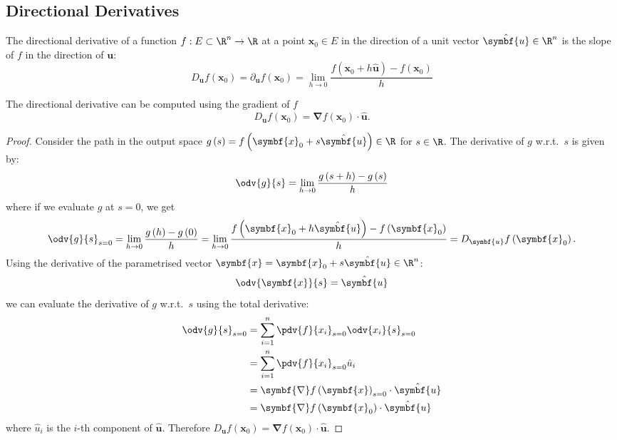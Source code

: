 \documentclass{article}
\begin{document}
\subsection{Directional Derivatives}
The directional derivative of a function \(f : E \subset \R^n \to \R\)
at a point \(\symbf{x}_0 \in E\) in the direction of a unit vector
\(\hat{\symbf{u}} \in \R^n\) is the slope of \(f\) in the direction of
\(\symbf{u}\):
\begin{equation*}
    D_{\symbf{u}} f\left( \symbf{x}_0 \right) = \partial_{\symbf{u}} f\left( \symbf{x}_0 \right) = \lim_{h \to 0}
     \frac{f\left( \symbf{x}_0 + h \hat{\symbf{u}} \right) - f\left(
     \symbf{x}_0 \right)}{h}
\end{equation*}
\begin{proposition}
    The directional derivative can be computed using the gradient of \(f\)
    \begin{equation*}
        D_{\symbf{u}} f\left( \symbf{x}_0 \right) = \symbf{\nabla} f\left( \symbf{x}_0 \right) \cdot \hat{\symbf{u}}.
    \end{equation*}
\end{proposition}
\begin{proof}
    Consider the path in the output space \(g\left( s \right) = f\left( \symbf{x}_0 + s \hat{\symbf{u}} \right) \in \R\) for \(s \in \R\).
    The derivative of \(g\) w.r.t.\ \(s\) is given by:
    \begin{equation*}
        \odv{g}{s} = \lim_{h \to 0} \frac{g\left( s + h \right) - g\left( s \right)}{h}
    \end{equation*}
    where if we evaluate \(g\) at \(s = 0\), we get
    \begin{equation*}
        \odv{g}{s}_{s = 0} = \lim_{h \to 0} \frac{g\left( h \right) - g\left( 0 \right)}{h} = \lim_{h \to 0} \frac{f\left( \symbf{x}_0 + h \hat{\symbf{u}} \right) - f\left( \symbf{x}_0 \right)}{h} = D_{\symbf{u}} f\left( \symbf{x}_0 \right).
    \end{equation*}
    Using the derivative of the parametrised vector \(\symbf{x} = \symbf{x}_0 + s \hat{\symbf{u}} \in \R^n\):
    \begin{equation*}
        \odv{\symbf{x}}{s} = \hat{\symbf{u}}
    \end{equation*}
    we can evaluate the derivative of \(g\) w.r.t.\ \(s\) using the total derivative:
    \begin{align*}
        \odv{g}{s}_{s = 0} & = \sum_{i = 1}^n \pdv{f}{x_i}_{s = 0} \odv{x_i}{s}_{s = 0}               \\
                           & = \sum_{i = 1}^n \pdv{f}{x_i}_{s = 0} \hat{u}_i                          \\
                           & = \symbf{\nabla} f\left( \symbf{x} \right)_{s = 0} \cdot \hat{\symbf{u}} \\
                           & = \symbf{\nabla} f\left( \symbf{x}_0 \right) \cdot \hat{\symbf{u}}
    \end{align*}
    where \(\hat{u}_i\) is the \(i\)-th component of \(\hat{\symbf{u}}\).
    Therefore \(D_{\symbf{u}} f\left( \symbf{x}_0 \right) = \symbf{\nabla} f\left( \symbf{x}_0 \right) \cdot \hat{\symbf{u}}\).
\end{proof}
\end{document}

